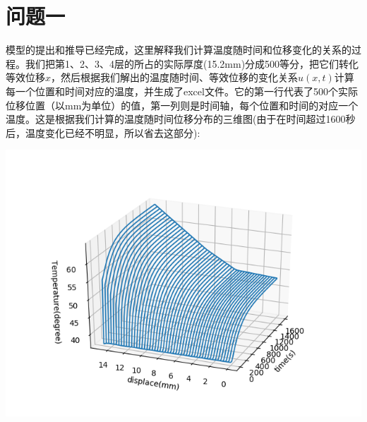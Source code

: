 \documentclass[bwprint]{cumcmthesis}
\begin{document}
\section{问题一}
\indent 模型的提出和推导已经完成，这里解释我们计算温度随时间和位移变化的关系的过程。我们把第1、2、3、4层的所占的实际厚度(15.2mm)分成500等分，把它们转化等效位移$x$，然后根据我们解出的温度随时间、等效位移的变化关系$u(x,t)$计算每一个位置和时间对应的温度，并生成了excel文件。它的第一行代表了500个实际位移位置（以mm为单位）的值，第一列则是时间轴，每个位置和时间的对应一个温度。这是根据我们计算的温度随时间位移分布的三维图(由于在时间超过1600秒后，温度变化已经不明显，所以省去这部分):
\begin{flushleft}
    \includegraphics[scale=1]{Problem_12.png}
\end{flushleft}
\end{document}
